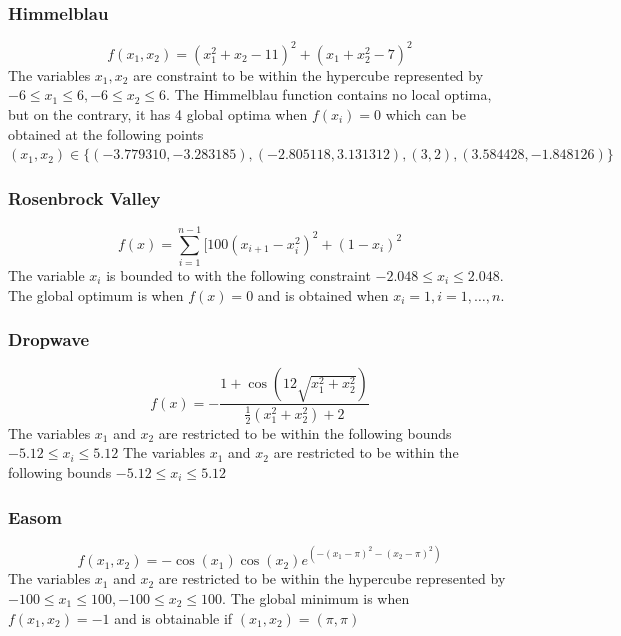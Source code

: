 \subsubsection{Himmelblau}
\begin{equation}
	f(x_1,x_2) = (x_1^2 + x_2 - 11)^2 + (x_1 + x_2^2 - 7)^2
\end{equation}
The variables $x_1,x_2$ are constraint to be within the hypercube represented by $-6 \leq x_1 \leq 6, -6 \leq x_2 \leq 6$. The Himmelblau function contains no local optima, but on the contrary, it has 4 global optima when $f(x_i) = 0$ which can be obtained at the following points $(x_1,x_2) \in \{(-3.779310,-3.283185),(-2.805118,3.131312),(3,2),(3.584428,-1.848126)\}$
\subsubsection{Rosenbrock Valley}
\begin{equation}
	f(x) = \sum_{i=1}^{n-1}[100(x_{i+1} - x_i^2)^2 + (1-x_i)^2
\end{equation}
The variable $x_i$ is bounded to with the following constraint $ -2.048 \leq x_i \leq 2.048 $. The global optimum is when $f(x) = 0$ and is obtained when $x_i = 1, i = 1,\ldots,n$.
\subsubsection{Dropwave}
\begin{equation}
	f(x) = -\frac{1 + \cos{(12\sqrt{x_1^2 + x_2^2})}}{\frac{1}{2}(x_1^2 + x_2^2) + 2}
\end{equation}
The variables $x_1$ and $x_2$ are restricted to be within the following bounds $-5.12 \leq x_i \leq 5.12$
The variables $x_1$ and $x_2$ are restricted to be within the following bounds $-5.12 \leq x_i \leq 5.12$
\subsubsection{Easom}
\begin{equation}
	f(x_1,x_2) = -\cos(x_1)\cos(x_2)e^{(-(x_1 - \pi)^2 - (x_2 - \pi)^2)}
\end{equation}
The variables $x_1$ and $x_2$ are restricted to be within the hypercube represented by $-100 \leq x_1 \leq 100, -100 \leq x_2 \leq 100$. The global minimum is when $f(x_1,x_2) = -1$ and is obtainable if $(x_1,x_2) = (\pi,\pi)$
